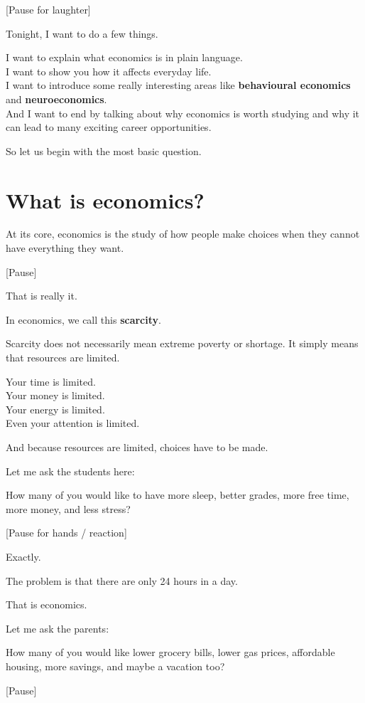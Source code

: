 \documentclass[12pt]{article}
\begin{document}
[Pause for laughter]

Tonight, I want to do a few things.

I want to explain what economics is in plain language.\\
I want to show you how it affects everyday life.\\
I want to introduce some really interesting areas like \textbf{behavioural economics} and \textbf{neuroeconomics}.\\
And I want to end by talking about why economics is worth studying and why it can lead to many exciting career opportunities.

So let us begin with the most basic question.

\section*{What is economics?}

At its core, economics is the study of how people make choices when they cannot have everything they want.

[Pause]

That is really it.

In economics, we call this \textbf{scarcity}.

Scarcity does not necessarily mean extreme poverty or shortage. It simply means that resources are limited.

Your time is limited.\\
Your money is limited.\\
Your energy is limited.\\
Even your attention is limited.

And because resources are limited, choices have to be made.

Let me ask the students here:

How many of you would like to have more sleep, better grades, more free time, more money, and less stress?

[Pause for hands / reaction]

Exactly.

The problem is that there are only 24 hours in a day.

That is economics.

Let me ask the parents:

How many of you would like lower grocery bills, lower gas prices, affordable housing, more savings, and maybe a vacation too?

[Pause]
\end{document}
